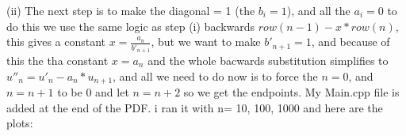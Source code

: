 \documentclass[norsk,a4paper,12pt]{article}
\begin{document}
(ii)\newline
The next step is to make the diagonal = 1 (the $b_i =1$), and all the $a_i = 0$ to do this we use the same logic as step (i)
backwards $row(n-1) - x*row(n)$, this gives a constant $x = \frac{a_{n}}{b'_{n+1}}$, but we want to make $b'_{n+1} = 1$, and because
of this the tha constant $x = a_n$ and the whole bacwards substitution simplifies to $u''_n = u'_n - a_n*u_{n+1}$, and 
all we need to do now is to force the $n = 0$, and $n = n+1$ to be $0$ and let $n = n+2$ so we get the endpoints. My Main.cpp file
is added at the end of the PDF. i ran it with n= 10, 100, 1000 and here are the plots:

\begin{figure}[H]
  \begin{center}
     \\

\end{center}
\end{figure}
\end{document}
